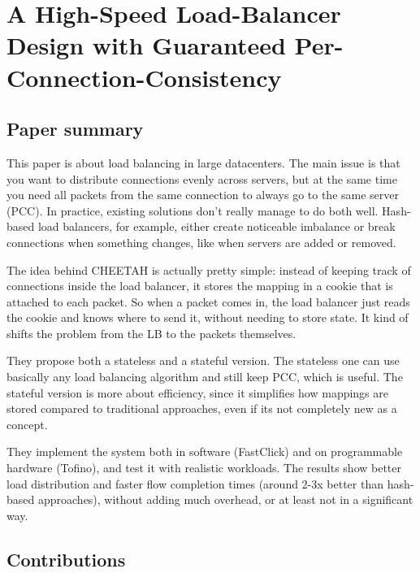 \documentclass[a4paper, 12pt]{article}
\begin{document}
\section*{A High-Speed Load-Balancer Design with
Guaranteed Per-Connection-Consistency}
\subsection{Paper summary}

This paper is about load balancing in large datacenters. The main issue is that you want to distribute connections evenly across servers, but at the same time you need all packets from the same connection to always go to the same server (PCC). In practice, existing solutions don't really manage to do both well. Hash-based load balancers, for example, either create noticeable imbalance or break connections when something changes, like when servers are added or removed.

The idea behind CHEETAH is actually pretty simple: instead of keeping track of connections inside the load balancer, it stores the mapping in a cookie that is attached to each packet. So when a packet comes in, the load balancer just reads the cookie and knows where to send it, without needing to store state. It kind of shifts the problem from the LB to the packets themselves.

They propose both a stateless and a stateful version. The stateless one can use basically any load balancing algorithm and still keep PCC, which is useful. The stateful version is more about efficiency, since it simplifies how mappings are stored compared to traditional approaches, even if its not completely new as a concept.

They implement the system both in software (FastClick) and on programmable hardware (Tofino), and test it with realistic workloads. The results show better load distribution and faster flow completion times (around 2-3x better than hash-based approaches), without adding much overhead, or at least not in a significant way.

\subsection{Contributions}
\end{document}

